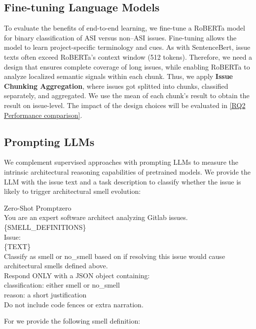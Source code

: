 \subsection{Fine-tuning Language Models}
\label{sec:roberta}
To evaluate the benefits of end-to-end learning, we fine-tune a RoBERTa model for binary classification of \ac{ASI} versus non–\ac{ASI} issues.
Fine-tuning allows the model to learn project-specific terminology and cues.
As with SentenceBert, issue texts often exceed RoBERTa’s context window (512 tokens).
Therefore, we need a design that ensures complete coverage of long issues, while enabling RoBERTa to analyze localized semantic signals within each chunk.
Thus, we apply \textbf{Issue Chunking Aggregation}, where issues got splitted into chunks, classified separately, and aggregated.
We use the mean of each chunk's result to obtain the result on issue-level.
The impact of the design choices will be evaluated in \ref{RQ2 Performance comparison}.

\subsection{Prompting LLMs}
\label{sec:llm-based}
We complement supervised approaches with prompting \acp{LLM} to measure the intrinsic architectural reasoning capabilities of pretrained models.
We provide the \ac{LLM} with the issue text and a task description to classify whether the issue is likely to trigger architectural smell evolution:
\begin{promptR}{Zero-Shot Prompt}{zero}\\
    You are an expert software architect analyzing Gitlab issues.\\
    \{SMELL\_DEFINITIONS\}\\
    Issue:\\
    \{TEXT\}\\
    Classify as smell or no\_smell based on if resolving this issue would cause architectural smells defined above.\\
    Respond ONLY with a JSON object containing: \\
 classification: either smell or no\_smell \\
 reason: a short justification \\
Do not include code fences or extra narration.
\end{promptR}
\noindent For \ARCADE we provide the following smell definition:

